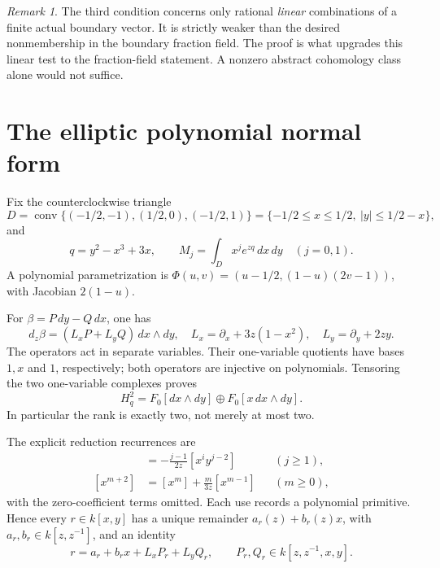 \documentclass[11pt]{article}
\numberwithin{equation}{section}
\theoremstyle{definition}
\theoremstyle{remark}
\newtheorem{remark}[remark]{Remark}
\newcommand{\dd}{\,d}
\newcommand{\Hq}{H_q^2}
\begin{document}
\begin{remark}
The third condition concerns only rational \emph{linear} combinations of a
finite actual boundary vector. It is strictly weaker than the desired
nonmembership in the boundary fraction field. The proof is what upgrades
this linear test to the fraction-field statement. A nonzero abstract
cohomology class alone would not suffice.
\end{remark}

\section{The elliptic polynomial normal form}
Fix the counterclockwise triangle
\[
 D=\operatorname{conv}\{(-1/2,-1),(1/2,0),(-1/2,1)\}
 =\{-1/2\le x\le1/2,\ |y|\le1/2-x\},
\]
and
\[
 q=y^2-x^3+3x,\qquad
 M_j=\int_Dx^j e^{zq}\dd x\dd y\quad(j=0,1).
\]
A polynomial parametrization is
$\Phi(u,v)=(u-1/2,(1-u)(2v-1))$, with Jacobian $2(1-u)$.

For $\beta=P\,dy-Q\,dx$, one has
\[
 d_z\beta=(L_xP+L_yQ)\,dx\wedge dy,
\quad L_x=\partial_x+3z(1-x^2),\quad L_y=\partial_y+2zy.
\]
The operators act in separate variables. Their one-variable quotients have
bases $1,x$ and $1$, respectively; both operators are injective on
polynomials. Tensoring the two one-variable complexes proves
\begin{equation}\label{eq:ranktwo}
 \Hq=F_0[dx\wedge dy]\oplus F_0[x\,dx\wedge dy].
\end{equation}
In particular the rank is exactly two, not merely at most two.

The explicit reduction recurrences are
\begin{align}
 [x^i y^j]&=-\frac{j-1}{2z}[x^i y^{j-2}] &&(j\ge1),\label{eq:yrec}\\
 [x^{m+2}]&=[x^m]+\frac{m}{3z}[x^{m-1}] &&(m\ge0),\label{eq:xrec}
\end{align}
with the zero-coefficient terms omitted. Each use records a polynomial
primitive. Hence every $r\in k[x,y]$ has a unique remainder
$a_r(z)+b_r(z)x$, with $a_r,b_r\in k[z,z^{-1}]$, and an identity
\begin{equation}\label{eq:elliptic-normal}
 r=a_r+b_rx+L_xP_r+L_yQ_r,
 \qquad P_r,Q_r\in k[z,z^{-1},x,y].
\end{equation}
\end{document}
